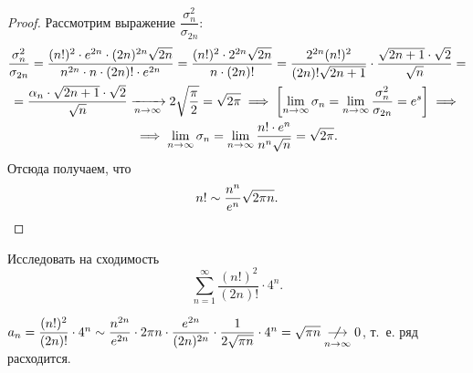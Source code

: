\documentclass[../../main.tex]{subfiles}
\begin{document}
\begin{proof}
Рассмотрим выражение $\dfrac{\sigma_n^2}{\sigma_{2n}}$:
\begin{gather*}
\dfrac{\sigma_n^2}{\sigma_{2n}} = 
\dfrac{(n!)^2\cdot e^{2n}\cdot (2n)^{2n}\sqrt{2n}}{n^{2n}\cdot n\cdot 
(2n)!\cdot e^{2n}} =
\dfrac{(n!)^2\cdot2^{2n}\sqrt{2n}}{n\cdot(2n)!} =
\dfrac{2^{2n}(n!)^2}{(2n)!\sqrt{2n + 1}} \cdot 
\dfrac{\sqrt{2n+1}\cdot\sqrt{2}}{\sqrt{n}} = 
\\ =
\dfrac{\alpha_n\cdot\sqrt{2n + 1}\cdot\sqrt{2}}{\sqrt{n}} \xrightarrow[n\to\infty]{}
2\sqrt{\dfrac{\pi}{2}} = \sqrt{2\pi} \implies
\left[\lim\limits_{n \to \infty} \sigma_n = \lim\limits_{n\to\infty} 
\dfrac{\sigma_n^2}{\sigma_{2n}} = e^s\right] \implies \\ \implies
\lim\limits_{n\to\infty} \sigma_n = \lim\limits_{n\to\infty} \dfrac{n!\cdot 
e^n}{n^n \sqrt{n}} = \sqrt{2\pi}.
\end{gather*}
Отсюда получаем, что
\[
n! \sim \dfrac{n^n}{e^n}\sqrt{2\pi n}. \qedhere
\]
\end{proof}
\begin{example}
Исследовать на сходимость
\[\sum\limits_{n=1}^\infty\dfrac{(n!)^2}{(2n)!}\cdot4^n.\]

$a_n = \dfrac{(n!)^2}{(2n)!}\cdot4^n \sim \dfrac{n^{2n}}{e^{2n}} 
\cdot 2\pi n \cdot \dfrac{e^{2n}}{(2n)^{2n}} \cdot \dfrac1{2 \sqrt{\pi n}}
\cdot 4^n = \sqrt{\pi n} \underset{n\to\infty}{\centernot\longrightarrow} 0
$, т.~е. ряд расходится.
\end{example}
\end{document}
